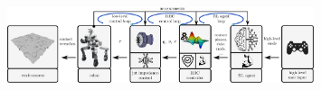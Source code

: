 \begin{columns}[t]

	\begin{Large}
	
	\begin{column}{0.5\textwidth}
		\begin{figure}[h]
			\includegraphics[width=0.8\textwidth]{docs/imgs/approach.png}
		\end{figure}
		
		\vspace{10cm}

	\end{column}

	\begin{column}{0.5\textwidth}

		\vspace{10cm}
		
	\end{column}
	\end{Large}
\end{columns}